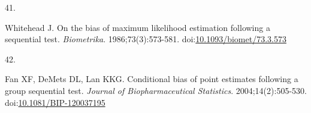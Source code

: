 \documentclass[
  11pt,
]{article}
\newlength{\cslhangindent}
\newlength{\csllabelwidth}
\newenvironment{CSLReferences}[2] %
 {\begin{list}{}{%
  \setlength{\itemindent}{0pt}
  \setlength{\leftmargin}{0pt}
  \setlength{\parsep}{0pt}
  \ifodd #1
   \setlength{\leftmargin}{\cslhangindent}
   \setlength{\itemindent}{-1\cslhangindent}
  \fi
  \setlength{\itemsep}{#2\baselineskip}}}
 {\end{list}}
\newcommand{\CSLLeftMargin}[1]{\parbox[t]{\csllabelwidth}{\strut#1\strut}}
\newcommand{\CSLRightInline}[1]{\parbox[t]{\linewidth - \csllabelwidth}{\strut#1\strut}}
\begin{document}
\begin{CSLReferences}{0}{1}
\CSLLeftMargin{41. }%
\CSLRightInline{Whitehead J. On the bias of maximum likelihood estimation following a sequential test. \emph{Biometrika}. 1986;73(3):573-581. doi:\href{https://doi.org/10.1093/biomet/73.3.573}{10.1093/biomet/73.3.573}}

\CSLLeftMargin{42. }%
\CSLRightInline{Fan XF, DeMets DL, Lan KKG. Conditional bias of point estimates following a group sequential test. \emph{Journal of Biopharmaceutical Statistics}. 2004;14(2):505-530. doi:\href{https://doi.org/10.1081/BIP-120037195}{10.1081/BIP-120037195}}

\end{CSLReferences}
\end{document}
